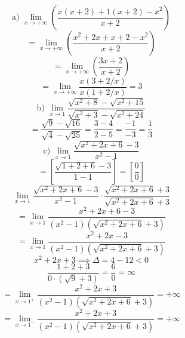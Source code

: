 \documentclass{article}
\begin{document}
\[ \text{a) } \lim_{x \to +\infty} \left( \frac{x(x+2)+1(x+2)-x^2}{x+2} \right) \]
\[ = \lim_{x \to +\infty} \left( \frac{x^2+2x+x+2-x^2}{x+2} \right) \]
\[ = \lim_{x \to +\infty} \left( \frac{3x+2}{x+2} \right) \]
\[ = \lim_{x \to +\infty} \frac{x(3+2/x)}{x(1+2/x)} = 3 \]
\[ \text{b) } \lim_{x \to 1} \frac{\sqrt{x^2+8}-\sqrt{x^2+15}}{\sqrt{x^2+3}-\sqrt{x^2+24}} \]
\[ = \frac{\sqrt{9}-\sqrt{16}}{\sqrt{4}-\sqrt{25}} = \frac{3-4}{2-5} = \frac{-1}{-3} = \frac{1}{3} \]
\[ \text{c) } \lim_{x \to 1} \frac{\sqrt{x^2+2x+6}-3}{x^2-1} \]
\[ = \left[ \frac{\sqrt{1+2+6}-3}{1-1} \right] = \left[ \frac{0}{0} \right] \]
\[ \lim_{x \to 1} \frac{\sqrt{x^2+2x+6}-3}{x^2-1} \cdot \frac{\sqrt{x^2+2x+6}+3}{\sqrt{x^2+2x+6}+3} \]
\[ = \lim_{x \to 1} \frac{x^2+2x+6-3}{(x^2-1)(\sqrt{x^2+2x+6}+3)} \]
\[ = \lim_{x \to 1} \frac{x^2+2x-3}{(x^2-1)(\sqrt{x^2+2x+6}+3)} \]
\[ x^2 + 2x + 3 \implies \Delta = 4 - 12 < 0\]
\[ \frac{1 + 2 + 3}{0 \cdot (\sqrt{9} + 3)} = \frac{6}{0} = \infty\]
\[ = \lim_{x \to 1^+} \frac{x^2 + 2x + 3}{(x^2-1)(\sqrt{x^2+2x+6}+3)} = +\infty \]
\[ = \lim_{x \to 1^-} \frac{x^2 + 2x + 3}{(x^2-1)(\sqrt{x^2+2x+6}+3)} = +\infty \]
\end{document}
